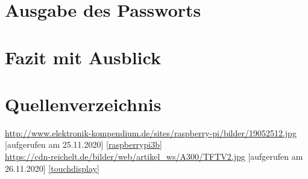 \documentclass[a4paper,11pt,singlespacing]{article}
\begin{document}
    	\section{Ausgabe des Passworts}
    	
    	\section{Fazit mit Ausblick}
    	
    	\section{Quellenverzeichnis}
    	
    	\url{http://www.elektronik-kompendium.de/sites/raspberry-pi/bilder/19052512.jpg} [aufgerufen am 25.11.2020] \ref{raspberrypi3b} \\
    	
    	\url{https://cdn-reichelt.de/bilder/web/artikel_ws/A300/TFTV2.jpg} [aufgerufen am 26.11.2020] \ref{touchdisplay}
\end{document}
